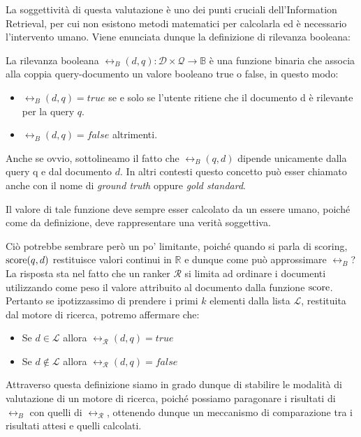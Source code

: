 La soggettività di questa valutazione è uno dei punti cruciali dell'Information Retrieval, per cui non esistono
metodi matematici per calcolarla ed è necessario l'intervento umano.
Viene enunciata dunque la definizione di rilevanza booleana:

\begin{definizione}\label{def:relb}
	La rilevanza booleana $\rel_B(d,q): \mathcal{D} \times \mathcal{Q} \rightarrow \mathbb{B}$
	è una funzione binaria che associa alla coppia query-documento un valore booleano
	true o false, in questo modo:
	\begin{itemize}
		\item		$\rel_B(d,q) = true$ se e solo se l'utente ritiene che il documento d è rilevante
		per la query $q$.
		\item $\rel_B(d,q) = false$ altrimenti.
	\end{itemize}
	
	Anche se ovvio, sottolineamo il fatto che $\rel_B(q,d)$ dipende unicamente dalla query q e
	dal documento $d$. In altri contesti questo concetto può esser chiamato anche con il nome
	di \textit{ground truth} oppure \textit{gold standard}.
\end{definizione}

Il valore di tale funzione deve sempre esser calcolato da un essere umano, poiché come da definizione, 
deve rappresentare una verità soggettiva.

Ciò potrebbe sembrare però un po' limitante, poiché quando si parla di scoring,
$\text{score}(q,d)$ restituisce valori continui in $\mathbb{R}$ e dunque come può
approssimare $\rel_B$?
La risposta sta nel fatto che un ranker $\mathcal{R}$ si limita ad ordinare i documenti utilizzando come peso
il valore attribuito al documento dalla funzione $\text{score}$. Pertanto se ipotizzassimo di prendere
i primi $k$ elementi dalla lista $\mathcal{L}$, restituita dal motore di ricerca, potremo affermare che:

\begin{itemize}
	\item Se $d \in \mathcal{L}$  allora $\rel_{\mathcal{R}}(d, q) = true$
	\item Se $d \notin \mathcal{L}$ allora $\rel_{\mathcal{R}}(d,q) = false$
\end{itemize}

Attraverso questa definizione siamo in grado dunque di stabilire le modalità di valutazione di
un motore di ricerca, poiché possiamo paragonare i risultati di $\rel_B$ con quelli di $\rel_{\mathcal{R}}$,
ottenendo dunque un meccanismo di comparazione tra i risultati attesi e quelli calcolati.

